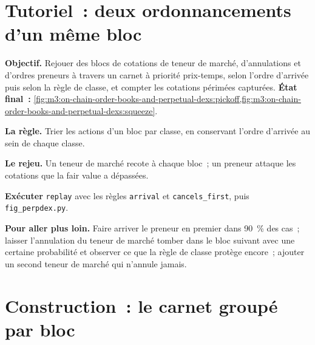 \section{Tutoriel~: deux ordonnancements d'un même bloc}\label{tut:m3:on-chain-order-books-and-perpetual-dexs:replay}

\begin{tutorial}
\textbf{Objectif.} Rejouer des blocs de cotations de teneur de marché, d'annulations et d'ordres preneurs à travers un carnet à priorité prix-temps, selon l'ordre d'arrivée puis selon la règle de classe, et
compter les cotations périmées capturées. \textbf{État final~:} \cref{fig:m3:on-chain-order-books-and-perpetual-dexs:pickoff,fig:m3:on-chain-order-books-and-perpetual-dexs:squeeze}.
\begin{tutsteps}
\item \textbf{La règle.} Trier les actions d'un bloc par classe, en conservant l'ordre d'arrivée au sein de chaque classe.
\label{lst:m3:on-chain-order-books-and-perpetual-dexs:order}
\item \textbf{Le rejeu.} Un teneur de marché recote à chaque bloc~; un preneur attaque les cotations que la fair value a dépassées.
\label{lst:m3:on-chain-order-books-and-perpetual-dexs:replay}
\item \textbf{Exécuter} \texttt{replay} avec les règles \texttt{arrival} et \texttt{cancels\_first}, puis \texttt{fig\_perpdex.py}.
\end{tutsteps}
\textbf{Pour aller plus loin.} Faire arriver le preneur en premier dans 90~\% des cas~; laisser l'annulation du teneur de marché tomber dans le bloc suivant avec une certaine probabilité et observer ce que la
règle de classe protège encore~; ajouter un second teneur de marché qui n'annule jamais.
\end{tutorial}

\section{Construction~: le carnet groupé par bloc}\label{bld:m3:on-chain-order-books-and-perpetual-dexs:blockbook}

